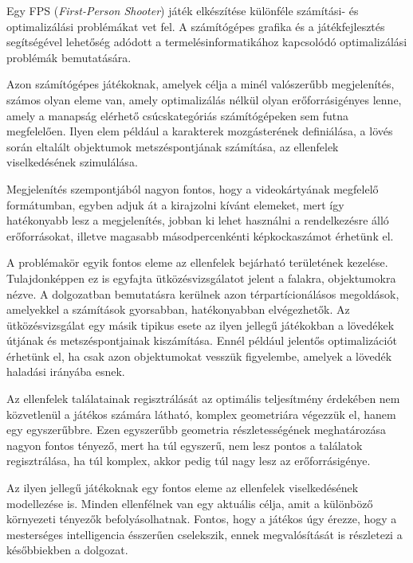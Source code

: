 \label{Chap:bevezetes}

Egy FPS (\textit{First-Person Shooter}) játék elkészítése különféle számítási- és optimalizálási problémákat vet fel. A számítógépes grafika és a játékfejlesztés segítségével lehetőség adódott a termelésinformatikához kapcsolódó optimalizálási problémák bemutatására.

Azon számítógépes játékoknak, amelyek célja a minél valószerűbb megjelenítés, számos olyan eleme van, amely optimalizálás nélkül olyan erőforrásigényes lenne, amely a manapság elérhető csúcskategóriás számítógépeken sem futna megfelelően. Ilyen elem például a karakterek mozgásterének definiálása, a lövés során eltalált objektumok metszéspontjának számítása, az ellenfelek viselkedésének szimulálása.

Megjelenítés szempontjából nagyon fontos, hogy a videokártyának megfelelő formátumban, egyben adjuk át a kirajzolni kívánt elemeket, mert így hatékonyabb lesz a megjelenítés, jobban ki lehet használni a rendelkezésre álló erőforrásokat, illetve magasabb másodpercenkénti képkockaszámot érhetünk el.

A problémakör egyik fontos eleme az ellenfelek bejárható területének kezelése. Tulajdonképpen ez is egyfajta ütközésvizsgálatot jelent a falakra, objektumokra nézve. A dolgozatban bemutatásra kerülnek azon térpartícionálásos megoldások, amelyekkel a számítások gyorsabban, hatékonyabban elvégezhetők. Az ütközésvizsgálat egy másik tipikus esete az ilyen jellegű játékokban a lövedékek útjának és metszéspontjainak kiszámítása. Ennél például jelentős optimalizációt érhetünk el, ha csak azon objektumokat vesszük figyelembe, amelyek a lövedék haladási irányába esnek.

Az ellenfelek találatainak regisztrálását az optimális teljesítmény érdekében nem közvetlenül a játékos számára látható, komplex geometriára végezzük el, hanem egy egyszerűbbre. Ezen egyszerűbb geometria részletességének meghatározása nagyon fontos tényező, mert ha túl egyszerű, nem lesz pontos a találatok regisztrálása, ha túl komplex, akkor pedig túl nagy lesz az erőforrásigénye.

Az ilyen jellegű játékoknak egy fontos eleme az ellenfelek viselkedésének modellezése is. Minden ellenfélnek van egy aktuális célja, amit a különböző környezeti tényezők befolyásolhatnak. Fontos, hogy a játékos úgy érezze, hogy a mesterséges intelligencia ésszerűen cselekszik, ennek megvalósítását is részletezi a későbbiekben a dolgozat.
